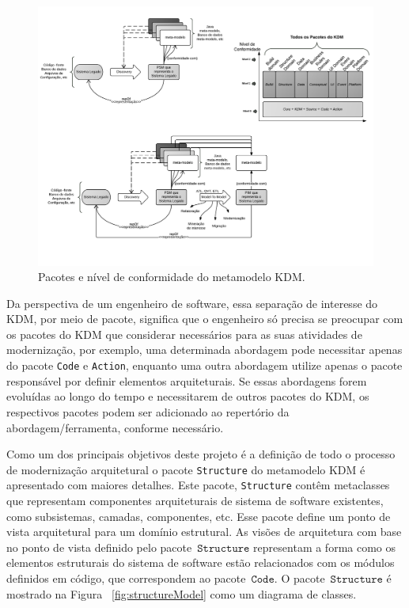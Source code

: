 \documentclass[12pt]{article}
\begin{document}
\begin{figure}[htb]
 \centering
 \includegraphics[scale=1]{kdmLevels_pacotes.pdf}
 \caption{Pacotes e nível de conformidade do metamodelo KDM.}
 \label{kdm:domain}
\end{figure}

Da perspectiva de um engenheiro de software, essa separação de interesse do KDM, por meio de pacote, significa que o engenheiro só precisa se preocupar com os pacotes do KDM que considerar necessários para as suas atividades de modernização, por exemplo, uma determinada abordagem pode necessitar apenas do pacote \texttt{Code} e \texttt{Action}, enquanto uma outra abordagem utilize apenas o pacote responsável por definir elementos arquiteturais. Se essas abordagens forem evoluídas ao longo do tempo e necessitarem de outros pacotes do KDM, os respectivos pacotes podem ser adicionado ao repertório da abordagem/ferramenta, conforme necessário.

Como um dos principais objetivos deste projeto é a definição de todo o processo de modernização arquitetural o pacote \texttt{Structure} do metamodelo KDM é apresentado com maiores detalhes. Este pacote, \texttt{Structure} contêm metaclasses que representam componentes arquiteturais de sistema de software existentes, como subsistemas, camadas, componentes, etc. Esse pacote define um ponto de vista arquitetural para um domínio estrutural. As visões de arquitetura com base no ponto de vista definido pelo pacote~$\mathtt{Structure}$ representam a forma como os elementos estruturais do sistema de software estão relacionados com os módulos definidos em código, que correspondem ao pacote~$\mathtt{Code}$. O pacote~$\mathtt{Structure}$ é mostrado na Figura ~\ref{fig:structureModel} como um diagrama de classes.
\end{document}
